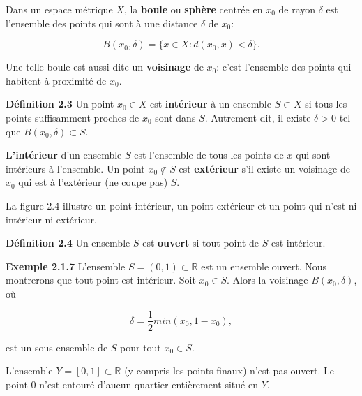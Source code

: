 \documentclass[10pt,twoside,a4paper]{book}
\begin{document}
Dans un espace métrique $X$, la \textbf{boule} ou \textbf{sphère} centrée en $x_0$ de rayon $\delta$ est l'ensemble des points qui sont à une distance $\delta$ de $x_0$:

\begin{equation}
  B(x_0, \delta) = \{x \in X : d(x_0, x) < \delta\}.
\end{equation}

\noindent
Une telle boule est aussi dite un \textbf{voisinage} de $x_0$: c'est l'ensemble des points qui habitent à proximité de $x_0$.

\vspace{4mm}
\noindent
\textbf{Définition 2.3} Un point $x_0 \in X$ est \textbf{intérieur} à un ensemble $S \subset X$ si tous les points suffisamment proches de $x_0$ sont dans $S$. Autrement dit, il existe $\delta > 0$ tel que $B(x_0, \delta) \subset S$.

\textbf{L'intérieur} d'un ensemble $S$ est l'ensemble de tous les points de $x$ qui sont intérieurs à l'ensemble. Un point $x_0  \notin S$ est \textbf{extérieur} s'il existe un voisinage de $x_0$ qui est à l'extérieur (ne coupe pas) $S$.

\vspace{2mm}
La figure 2.4 illustre un point intérieur, un point extérieur et un point qui n'est ni intérieur ni extérieur.



\vspace{4mm}
\noindent
\textbf{Définition 2.4} Un ensemble $S$ est \textbf{ouvert} si tout point de $S$ est intérieur.

\vspace{4mm}
\noindent
\textbf{Exemple 2.1.7} L'ensemble $S = (0, 1) \subset \mathbb{R}$ est un ensemble ouvert. Nous montrerons que tout point est intérieur. Soit $x_0 \in S$. Alors la voisinage $B(x_0, \delta)$, où

\begin{equation*}
  \delta = \frac{1}{2} min(x_0, 1 - x_0),
\end{equation*}

\noindent
est un sous-ensemble de $S$ pour tout $x_0 \in S$.

L'ensemble $Y = [0, 1] \subset \mathbb{R}$ (y compris les points finaux) n'est pas ouvert. Le point 0 n'est entouré d'aucun quartier entièrement situé en $Y$.
\end{document}
